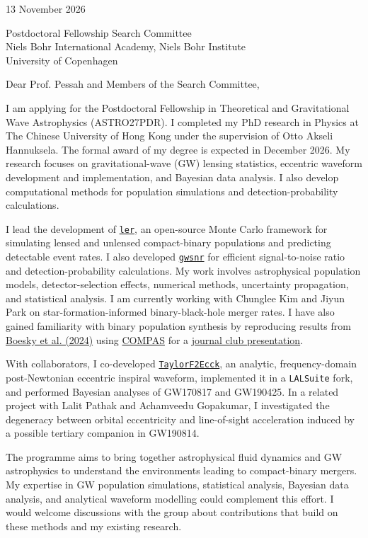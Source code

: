 \documentclass[11pt]{article}
\begin{document}
13 November 2026

Postdoctoral Fellowship Search Committee\\
Niels Bohr International Academy, Niels Bohr Institute\\
University of Copenhagen

Dear Prof. Pessah and Members of the Search Committee,

I am applying for the Postdoctoral Fellowship in Theoretical and Gravitational Wave Astrophysics (ASTRO27PDR). I completed my PhD research in Physics at The Chinese University of Hong Kong under the supervision of Otto Akseli Hannuksela. The formal award of my degree is expected in December 2026. My research focuses on gravitational-wave (GW) lensing statistics, eccentric waveform development and implementation, and Bayesian data analysis. I also develop computational methods for population simulations and detection-probability calculations.

I lead the development of \href{https://ler.hemantaph.com/}{\texttt{ler}}, an open-source Monte Carlo framework for simulating lensed and unlensed compact-binary populations and predicting detectable event rates. I also developed \href{https://gwsnr.hemantaph.com/}{\texttt{gwsnr}} for efficient signal-to-noise ratio and detection-probability calculations. My work involves astrophysical population models, detector-selection effects, numerical methods, uncertainty propagation, and statistical analysis. I am currently working with Chunglee Kim and Jiyun Park on star-formation-informed binary-black-hole merger rates. I have also gained familiarity with binary population synthesis by reproducing results from \href{https://arxiv.org/abs/2405.01623}{Boesky et al. (2024)} using \href{https://compas.science/}{COMPAS} for a \href{https://docs.google.com/presentation/d/1WBn-nu949xdn9oGZe1GgIlbHsQ_ZBelahJA6aSFyVq0/edit}{journal club presentation}.

With collaborators, I co-developed \href{https://arxiv.org/abs/2508.12697}{\texttt{TaylorF2Ecck}}, an analytic, frequency-domain post-Newtonian eccentric inspiral waveform, implemented it in a \texttt{LALSuite} fork, and performed Bayesian analyses of GW170817 and GW190425. In a related project with Lalit Pathak and Achamveedu Gopakumar, I investigated the degeneracy between orbital eccentricity and line-of-sight acceleration induced by a possible tertiary companion in GW190814.

The programme aims to bring together astrophysical fluid dynamics and GW astrophysics to understand the environments leading to compact-binary mergers. My expertise in GW population simulations, statistical analysis, Bayesian data analysis, and analytical waveform modelling could complement this effort. I would welcome discussions with the group about contributions that build on these methods and my existing research.
\end{document}
